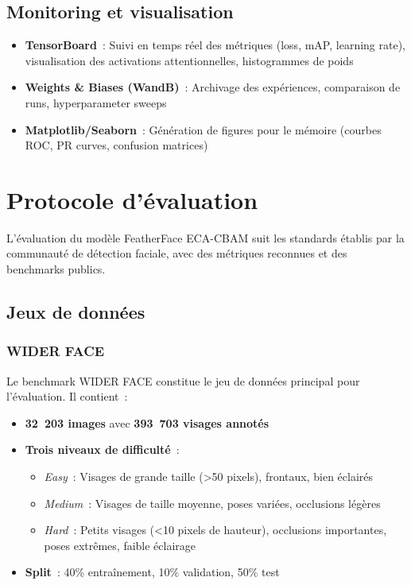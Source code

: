 \begin{onehalfspace}
\subsection{Monitoring et visualisation}

\begin{itemize}
\item \textbf{TensorBoard}~: Suivi en temps réel des métriques (loss, mAP, learning rate), visualisation des activations attentionnelles, histogrammes de poids

\item \textbf{Weights \& Biases (WandB)}~: Archivage des expériences, comparaison de runs, hyperparameter sweeps

\item \textbf{Matplotlib/Seaborn}~: Génération de figures pour le mémoire (courbes ROC, PR curves, confusion matrices)
\end{itemize}

\section{Protocole d'évaluation}

\hspace{0.65 cm}L'évaluation du modèle FeatherFace ECA-CBAM suit les standards établis par la communauté de détection faciale, avec des métriques reconnues et des benchmarks publics.

\subsection{Jeux de données}

\subsubsection{WIDER FACE}

\hspace{0.65 cm}Le benchmark WIDER FACE \cite{Yang2016WIDERFACE} constitue le jeu de données principal pour l'évaluation. Il contient~:

\begin{itemize}
\item \textbf{32~203 images} avec \textbf{393~703 visages annotés}
\item \textbf{Trois niveaux de difficulté}~:
   \begin{itemize}
   \item \textit{Easy}~: Visages de grande taille (>50 pixels), frontaux, bien éclairés
   \item \textit{Medium}~: Visages de taille moyenne, poses variées, occlusions légères
   \item \textit{Hard}~: Petits visages (<10 pixels de hauteur), occlusions importantes, poses extrêmes, faible éclairage
   \end{itemize}
\item \textbf{Split}~: 40\% entraînement, 10\% validation, 50\% test
\end{itemize}


\end{onehalfspace}
